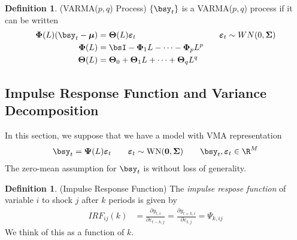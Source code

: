 \documentclass[12pt]{article}
\theoremstyle{plain}
\theoremstyle{definition}
\newtheorem{defn}[thm]{Definition}
\theoremstyle{remark}
\newcommand{\bsTheta}{\boldsymbol{\Theta}}
\newcommand{\bsmu}{\boldsymbol{\mu}}
\newcommand{\bsSigma}{\boldsymbol{\Sigma}}
\newcommand{\bsvarepsilon}{\boldsymbol{\varepsilon}}
\newcommand{\bsPsi}{\boldsymbol{\Psi}}
\newcommand{\bsPhi}{\boldsymbol{\Phi}}
\renewcommand{\bso}{\boldsymbol{0}}
\newcommand{\wn}{\sim\operatorname{WN}}
\begin{document}
\begin{defn}(VARMA($p,q$) Process)
$\{\bsy_t\}$ is a VARMA($p,q$) process if it can be written
\begin{align*}
  \bsPhi(L)(\bsy_t-\bsmu) &= \bsTheta(L)\bsvarepsilon_t
  \qquad\qquad\qquad\qquad\qquad \bsvarepsilon_t\sim WN(0,\bsSigma)
  \\
  \bsPhi(L) &= \bsI - \bsPhi_1 L - \cdots - \bsPhi_pL^p
  \\
  \bsTheta(L) &= \bsTheta_0 + \bsTheta_1 L + \cdots + \bsTheta_qL^q
\end{align*}
\end{defn}

\clearpage
\subsection{Impulse Response Function and Variance Decomposition}

In this section, we suppose that we have a model with VMA representation
\begin{align*}
  \bsy_t = \bsPsi(L)\bsvarepsilon_t
  \qquad
  \bsvarepsilon_t \wn(\bso,\bsSigma)
  \qquad\bsy_t,\bsvarepsilon_t\in \R^M
\end{align*}
The zero-mean assumption for $\bsy_t$ is without loss of generality.

\begin{defn}(Impulse Response Function)
The \emph{impulse respose function} of variable $i$ to shock $j$ after
$k$ periods is given by
\begin{align*}
  IRF_{ij}(k)
  &=
  \frac{\partial y_{t,i}}{\partial \varepsilon_{t-k,j}}
  =
  \frac{\partial y_{t+k,i}}{\partial \varepsilon_{t,j}}
  = \Psi_{k,ij}
\end{align*}
We think of this as a function of $k$.
\end{defn}
\end{document}
